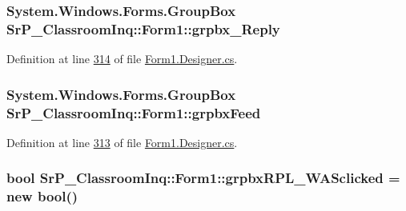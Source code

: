 \hypertarget{class_sr_p___classroom_inq_1_1_form1_a0f01472dc53a3c134d543b1a59299a1e}{
\subsubsection[{grpbx\-\_\-\-Reply}]{\setlength{\rightskip}{0pt plus 5cm}\-System.\-Windows.\-Forms.\-Group\-Box {\bf \-Sr\-P\-\_\-\-Classroom\-Inq\-::\-Form1\-::grpbx\-\_\-\-Reply}}}
\label{class_sr_p___classroom_inq_1_1_form1_a0f01472dc53a3c134d543b1a59299a1e}


\-Definition at line \hyperlink{_form1_8_designer_8cs_source_l00314}{314} of file \hyperlink{_form1_8_designer_8cs_source}{\-Form1.\-Designer.\-cs}.

\hypertarget{class_sr_p___classroom_inq_1_1_form1_ac6c672057738e4a54824f0c08e61b238}{
\subsubsection[{grpbx\-Feed}]{\setlength{\rightskip}{0pt plus 5cm}\-System.\-Windows.\-Forms.\-Group\-Box {\bf \-Sr\-P\-\_\-\-Classroom\-Inq\-::\-Form1\-::grpbx\-Feed}}}
\label{class_sr_p___classroom_inq_1_1_form1_ac6c672057738e4a54824f0c08e61b238}


\-Definition at line \hyperlink{_form1_8_designer_8cs_source_l00313}{313} of file \hyperlink{_form1_8_designer_8cs_source}{\-Form1.\-Designer.\-cs}.

\hypertarget{class_sr_p___classroom_inq_1_1_form1_a8759913b0dd88900294c267195dd81ea}{
\subsubsection[{grpbx\-R\-P\-L\-\_\-\-W\-A\-Sclicked}]{\setlength{\rightskip}{0pt plus 5cm}bool {\bf \-Sr\-P\-\_\-\-Classroom\-Inq\-::\-Form1\-::grpbx\-R\-P\-L\-\_\-\-W\-A\-Sclicked} = new bool()}}
\label{class_sr_p___classroom_inq_1_1_form1_a8759913b0dd88900294c267195dd81ea}


